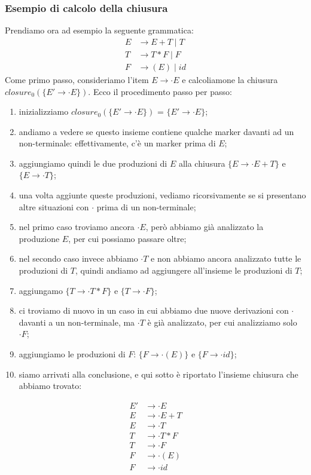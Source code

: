 \documentclass[class=book, crop=false, oneside, 12pt]{standalone}
\begin{document}
\subsubsection{Esempio di calcolo della chiusura}
Prendiamo ora ad esempio la seguente grammatica:
\begin{align*}
    E &\to E+T \mid T\\
    T &\to T*F \mid F\\
    F &\to (E) \mid id
\end{align*}
Come primo passo, consideriamo l'item \(E \to \cdot E\) e calcoliamone la chiusura \(closure_0(\{E' \to \cdot E\})\). Ecco il procedimento passo per passo:
\begin{enumerate}
    \item inizializziamo \(closure_0(\{E' \to \cdot E\})\) = \(\{E' \to \cdot E\}\); 
    \item andiamo a vedere se questo insieme contiene qualche marker davanti ad un non-terminale: effettivamente, c'è un marker prima di \(E\);
    \item aggiungiamo quindi le due produzioni di \(E\) alla chiusura \(\{E \to \cdot E+T\}\) e \(\{E \to \cdot T\}\);
    \item una volta aggiunte queste produzioni, vediamo ricorsivamente se si presentano altre situazioni con \(\cdot\) prima di un non-terminale;
    \item nel primo caso troviamo ancora \(\cdot E\), però abbiamo già analizzato la produzione \(E\), per cui possiamo passare oltre;
    \item nel secondo caso invece abbiamo \(\cdot T\) e non abbiamo ancora analizzato tutte le produzioni di \(T\), quindi andiamo ad aggiungere all'insieme le produzioni di \(T\);
    \item aggiungamo \(\{T \to \cdot T * F\}\) e \(\{T \to \cdot F\}\);
    \item ci troviamo di nuovo in un caso in cui abbiamo due nuove derivazioni con \(\cdot\) davanti
    a un non-terminale, ma \(\cdot T\) è già analizzato, per cui analizziamo solo \(\cdot F\);
    \item aggiungiamo le produzioni di \(F\): \(\{F \to \cdot (E)\}\) e \(\{F \to \cdot id \}\);
    \item siamo arrivati alla conclusione, e qui sotto è riportato l'insieme chiusura che abbiamo trovato:
\end{enumerate}
\begin{align*}
    E' &\to \cdot E \\
    E  &\to \cdot E+T \\
    E  &\to \cdot T \\
    T  &\to \cdot T * F \\
    T  &\to \cdot F \\
    F  &\to \cdot (E) \\
    F  &\to \cdot id
\end{align*}
\end{document}
